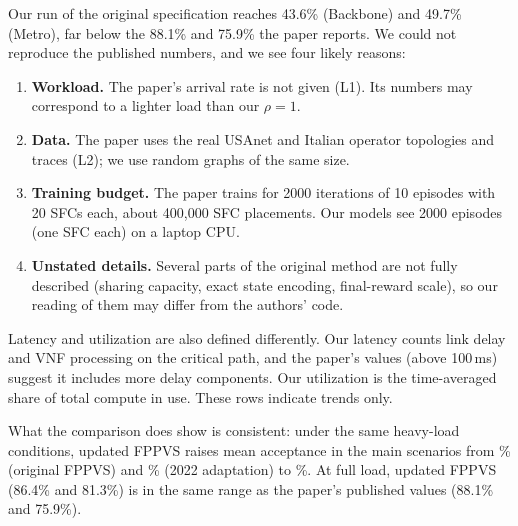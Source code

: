 Our run of the original specification reaches 43.6\% (Backbone) and 49.7\%
(Metro), far below the 88.1\% and 75.9\% the paper reports. We could not
reproduce the published numbers, and we see four likely reasons:
\begin{enumerate}
  \item \textbf{Workload.} The paper's arrival rate is not given (L1). Its
  numbers may correspond to a lighter load than our $\rho=1$.
  \item \textbf{Data.} The paper uses the real USAnet and Italian operator
  topologies and traces (L2); we use random graphs of the same size.
  \item \textbf{Training budget.} The paper trains for 2000 iterations of 10
  episodes with 20 SFCs each, about 400{,}000 SFC placements. Our models see
  2000 episodes (one SFC each) on a laptop CPU.
  \item \textbf{Unstated details.} Several parts of the original method are not
  fully described (sharing capacity, exact state encoding, final-reward scale),
  so our reading of them may differ from the authors' code.
\end{enumerate}
Latency and utilization are also defined differently. Our latency counts link
delay and VNF processing on the critical path, and the paper's values (above
100\,ms) suggest it includes more delay components. Our utilization is the
time-averaged share of total compute in use. These rows indicate trends only.

What the comparison does show is consistent: under the same heavy-load
conditions, updated FPPVS raises mean acceptance in the main scenarios from
\origMeanAcc\% (original FPPVS) and \zhangMeanAcc\% (2022 adaptation) to
\fppvsMeanAcc\%. At full load, updated FPPVS (86.4\% and 81.3\%) is in the same
range as the paper's published values (88.1\% and 75.9\%).
